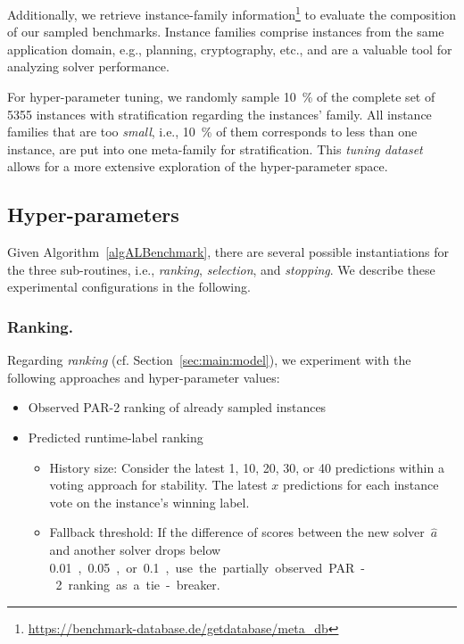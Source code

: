 \documentclass[runningheads]{llncs}
\begin{document}
Additionally, we retrieve instance-family information\footnote{\url{https://benchmark-database.de/getdatabase/meta_db}} to evaluate the composition of our sampled benchmarks.
Instance families comprise instances from the same application domain, e.g., planning, cryptography, etc., and are a valuable tool for analyzing solver performance.

For hyper-parameter tuning, we randomly sample \SI{10}{\%} of the complete set of 5355 instances with stratification regarding the instances' family.
All instance families that are too \emph{small}, i.e., \SI{10}{\%} of them corresponds to less than one instance, are put into one meta-family for stratification.
This \emph{tuning dataset} allows for a more extensive exploration of the hyper-parameter space.

\subsection{Hyper-parameters}
\label{sec:exdesign:hyper}

Given Algorithm~\ref{algALBenchmark}, there are several possible instantiations for the three sub-routines, i.e., \emph{ranking}, \emph{selection}, and \emph{stopping}.
We describe these experimental configurations in the following.

\subsubsection{Ranking.}

Regarding \emph{ranking} (cf. Section~\ref{sec:main:model}), we experiment with the following approaches and hyper-parameter values:

\begin{itemize}
  \item Observed PAR-2 ranking of already sampled instances
  \item Predicted runtime-label ranking
  \begin{itemize}
    \item
    History size: Consider the latest 1, 10, 20, 30, or 40 predictions within a voting approach for stability.
    The latest $x$ predictions for each instance vote on the instance's winning label.
    \item
    Fallback threshold: If the difference of scores between the new solver~$\hat{a}$ and another solver drops below \SI{0.01}, \SI{0.05}, or \SI{0.1}, use the partially observed PAR-2 ranking as a tie-breaker.
  \end{itemize}
\end{itemize}
\end{document}
